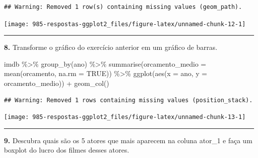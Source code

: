 \documentclass[
]{book}
\newenvironment{Shaded}{\begin{snugshade}}{\end{snugshade}}
\newcommand{\AttributeTok}[1]{\textcolor[rgb]{0.77,0.63,0.00}{#1}}
\newcommand{\ConstantTok}[1]{\textcolor[rgb]{0.00,0.00,0.00}{#1}}
\newcommand{\FunctionTok}[1]{\textcolor[rgb]{0.00,0.00,0.00}{#1}}
\newcommand{\NormalTok}[1]{#1}
\newcommand{\SpecialCharTok}[1]{\textcolor[rgb]{0.00,0.00,0.00}{#1}}
\begin{document}
\begin{verbatim}
## Warning: Removed 1 row(s) containing missing values (geom_path).
\end{verbatim}

\begin{center}\texttt{[image: 985-respostas-ggplot2\_files/figure-latex/unnamed-chunk-12-1]} \end{center}

\begin{center}\rule{0.5\linewidth}{0.5pt}\end{center}

\textbf{8.} Transforme o gráfico do exercício anterior em um gráfico de barras.

\begin{Shaded}
\begin{Highlighting}[]
\NormalTok{imdb }\SpecialCharTok{\%\textgreater{}\%} 
  \FunctionTok{group\_by}\NormalTok{(ano) }\SpecialCharTok{\%\textgreater{}\%} 
  \FunctionTok{summarise}\NormalTok{(}\AttributeTok{orcamento\_medio =} \FunctionTok{mean}\NormalTok{(orcamento, }\AttributeTok{na.rm =} \ConstantTok{TRUE}\NormalTok{)) }\SpecialCharTok{\%\textgreater{}\%} 
  \FunctionTok{ggplot}\NormalTok{(}\FunctionTok{aes}\NormalTok{(}\AttributeTok{x =}\NormalTok{ ano, }\AttributeTok{y =}\NormalTok{ orcamento\_medio)) }\SpecialCharTok{+}
  \FunctionTok{geom\_col}\NormalTok{()}
\end{Highlighting}
\end{Shaded}

\begin{verbatim}
## Warning: Removed 1 rows containing missing values (position_stack).
\end{verbatim}

\begin{center}\texttt{[image: 985-respostas-ggplot2\_files/figure-latex/unnamed-chunk-13-1]} \end{center}

\begin{center}\rule{0.5\linewidth}{0.5pt}\end{center}

\textbf{9.} Descubra quais são os 5 atores que mais aparecem na coluna ator\_1 e faça um boxplot do lucro dos filmes desses atores.
\end{document}
